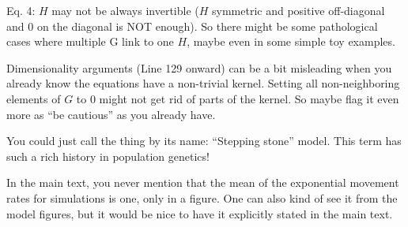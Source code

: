 
\begin{point}{Eq. 4:}
    $H$ may not be always invertible ($H$ symmetric and positive off-diagonal
    and 0 on the diagonal is NOT enough). So there might be some pathological
    cases where multiple G link to one $H$, maybe even in some simple toy
    examples.
\end{point}


\begin{point}{}
    Dimensionality arguments (Line 129 onward) can be a bit misleading when you
    already know the equations have a non-trivial kernel. Setting all
    non-neighboring elements of $G$ to 0 might not get rid of parts of the
    kernel. So maybe flag it even more as ``be cautious'' as you already have.
\end{point}


\begin{point}{}
    You could just call the thing by its name: ``Stepping stone'' model. This
    term has such a rich history in population genetics!
\end{point}


\begin{point}{}
    In the main text, you never mention that the mean of the exponential
    movement rates for simulations is one, only in a figure. One can also kind
    of see it from the model figures, but it would be nice to have it
    explicitly stated in the main text.
\end{point}


